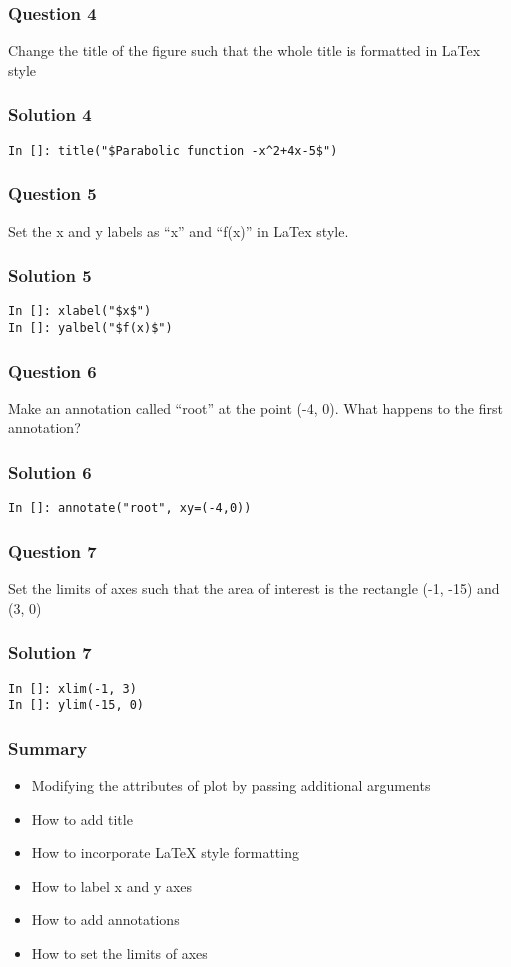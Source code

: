 \documentclass[presentation]{beamer}
\begin{document}
\begin{frame}
\frametitle{Question 4}
\label{sec-8}

  Change the title of the figure such that the whole title is
  formatted in LaTex style
\end{frame}
\begin{frame}[fragile]
\frametitle{Solution 4}
\label{sec-9}

\begin{verbatim}
In []: title("$Parabolic function -x^2+4x-5$")
\end{verbatim}
\end{frame}
\begin{frame}
\frametitle{Question 5}
\label{sec-10}

  Set the x and y labels as ``x'' and ``f(x)'' in LaTex style.
\end{frame}
\begin{frame}[fragile]
\frametitle{Solution 5}
\label{sec-11}

\begin{verbatim}
In []: xlabel("$x$")
In []: yalbel("$f(x)$")
\end{verbatim}
\end{frame}
\begin{frame}
\frametitle{Question 6}
\label{sec-12}

  Make an annotation called ``root'' at the point (-4, 0). What happens
  to the first annotation?
\end{frame}
\begin{frame}[fragile]
\frametitle{Solution 6}
\label{sec-13}

\begin{verbatim}
In []: annotate("root", xy=(-4,0))
\end{verbatim}
\end{frame}
\begin{frame}
\frametitle{Question 7}
\label{sec-14}

  Set the limits of axes such that the area of interest is the
  rectangle (-1, -15) and (3, 0)
\end{frame}
\begin{frame}[fragile]
\frametitle{Solution 7}
\label{sec-15}

\begin{verbatim}
In []: xlim(-1, 3)
In []: ylim(-15, 0)
\end{verbatim}
\end{frame}
\begin{frame}
\frametitle{Summary}
\label{sec-16}

\begin{itemize}
\item Modifying the attributes of plot by passing additional arguments
\item How to add title
\item How to incorporate \LaTeX{} style formatting
\item How to label x and y axes
\item How to add annotations
\item How to set the limits of axes
\end{itemize}
\end{frame}
\end{document}

